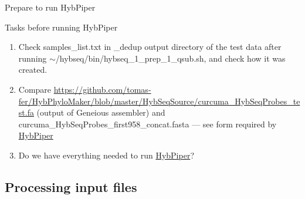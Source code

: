 \documentclass[compress,  xelatex, 11pt, xcolor=x11names, aspectratio=169,
	hyperref={
		bookmarks=true,
		unicode=true,
		colorlinks=true,
		pdftitle={HybSeq course},
		plainpages=false,
		pdfauthor={Vojtech Zeisek},
		pdfsubject={Practical processing of HybSeq target enrichment sequencing data on computing grids like MetaCentrum},
		pdfcreator={XeLaTeX},
		pdfkeywords={BASH, command line, GNU, HybSeq, Linux, MetaCentrum, sequencing shell, target enrichment},
		linkcolor=Turquoise4, %
		anchorcolor=DodgerBlue4, %
		citecolor=DodgerBlue4, %
		filecolor=DodgerBlue4, %
		menucolor=Tan4, %
		urlcolor=DarkOliveGreen4 %
		},
	url={hyphens, lowtilde} %
	]{beamer}
\renewcommand{\texttt}[1]{\colorbox{Cornsilk2}{{\ttfamily #1}}}
\begin{document}
\begin{frame}{Prepare to run HybPiper}
	\begin{exampleblock}{Tasks before running HybPiper}
		\begin{enumerate}
			\item Check \texttt{samples\_list.txt} in \texttt{2\_dedup} output directory of the test data after running \texttt{$\sim$/hybseq/bin/hybseq\_1\_prep\_1\_qsub.sh}, and check how it was created.
			\item Compare \url{https://github.com/tomas-fer/HybPhyloMaker/blob/master/HybSeqSource/curcuma_HybSeqProbes_test.fa} (output of Geneious assembler) and \texttt{curcuma\_HybSeqProbes\_first958\_concat.fasta} --- see form required by \href{https://github.com/mossmatters/HybPiper/wiki\#12-target-file}{HybPiper}
			\item Do we have everything needed to run \href{https://github.com/mossmatters/HybPiper/wiki}{HybPiper}?
		\end{enumerate}
	\end{exampleblock}
\end{frame}

\subsection{Processing input files}
\end{document}
